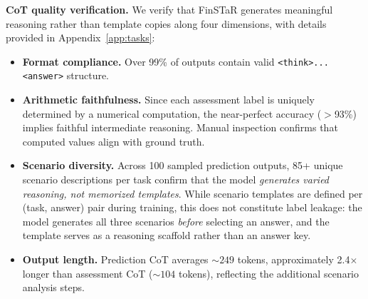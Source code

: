 \textbf{CoT quality verification.}
We verify that FinSTaR generates meaningful reasoning rather than template copies along four dimensions, with details provided in Appendix~\ref{app:tasks}:
\begin{itemize}
\item \textbf{Format compliance.} Over 99\% of outputs contain valid \texttt{<think>...<answer>} structure.
\item \textbf{Arithmetic faithfulness.} Since each assessment label is uniquely determined by a numerical computation, the near-perfect accuracy ($>$93\%) implies faithful intermediate reasoning. Manual inspection confirms that computed values align with ground truth.
\item \textbf{Scenario diversity.} Across 100 sampled prediction outputs, 85+ unique scenario descriptions per task confirm that the model \textit{generates varied reasoning, not memorized templates}.
While scenario templates are defined per (task, answer) pair during training, this does not constitute label leakage: the model generates all three scenarios \textit{before} selecting an answer, and the template serves as a reasoning scaffold rather than an answer key.
\item \textbf{Output length.} Prediction CoT averages ${\sim}249$ tokens, approximately 2.4$\times$ longer than assessment CoT (${\sim}104$ tokens), reflecting the additional scenario analysis steps.
\end{itemize}



